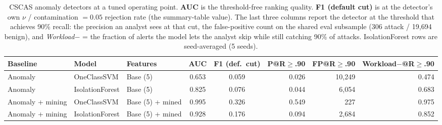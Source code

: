 \begin{table}[htbp]
\centering
\small
\caption{CSCAS anomaly detectors at a tuned operating point. \textbf{AUC} is the
threshold-free ranking quality. \textbf{F1 (default cut)} is at the detector's own
$\nu$ / contamination $= 0.05$ rejection rate (the summary-table value). The last
three columns report the detector at the threshold that achieves 90\% recall: the
precision an analyst sees at that cut, the false-positive count on the shared eval
subsample (306 attack / 19{,}694 benign), and \emph{Workload$-$} = the fraction of
alerts the model lets the analyst skip while still catching 90\% of attacks.
IsolationForest rows are seed-averaged (5 seeds).}
\label{tab:cscas-anomaly-operating-points}
\begin{tabular}{lllccrrr}
\toprule
\textbf{Baseline} & \textbf{Model} & \textbf{Features} & \textbf{AUC} & \textbf{F1 (def.\ cut)} & \textbf{P@R$\geq$.90} & \textbf{FP@R$\geq$.90} & \textbf{Workload$-$@R$\geq$.90} \\
\midrule
Anomaly & OneClassSVM & Base (5) & 0.653 & 0.059 & 0.026 & 10,249 & 0.474 \\
Anomaly & IsolationForest & Base (5) & 0.825 & 0.076 & 0.044 & 6,054 & 0.683 \\
Anomaly + mining & OneClassSVM & Base (5) + mined & 0.995 & 0.326 & 0.549 & 227 & 0.975 \\
Anomaly + mining & IsolationForest & Base (5) + mined & 0.928 & 0.176 & 0.094 & 2,684 & 0.852 \\
\bottomrule
\end{tabular}
\end{table}
